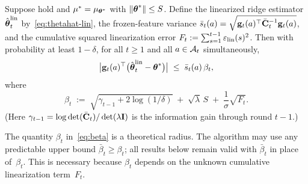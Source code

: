 \begin{lemma}%
\label{lem:confidence}
Suppose  hold and
$\mu^*=\mu_{\boldsymbol{\theta}^*}$ with $\|\boldsymbol{\theta}^*\|\le S$.
Define the linearized ridge estimator~$\hat{\boldsymbol{\theta}}_t^{\mathrm{lin}}$
by~\eqref{eq:thetahat-lin}, the frozen-feature variance
$\bar s_t(a)=\sqrt{\mathbf{g}_t(a)^\top\bar{\mathbf{C}}_t^{-1}\mathbf{g}_t(a)}$, and
the cumulative squared linearization error
$F_t := \sum_{s=1}^{t-1}\varepsilon_{\mathrm{lin}}(s)^2$.
Then with probability at least $1-\delta$, for all $t\ge 1$ and all
$a\in\mathcal{A}_t$ simultaneously,
\begin{equation}\label{eq:conf-lin}
  \bigl|\mathbf{g}_t(a)^\top
    \bigl(\hat{\boldsymbol{\theta}}_t^{\mathrm{lin}}-\boldsymbol{\theta}^*\bigr)\bigr|
  \;\le\;
  \bar s_t(a)\,\beta_t,
\end{equation}
where
\begin{equation}\label{eq:beta}
  \beta_t
  \;:=\;
  \sqrt{\gamma_{t-1} + 2\log(1/\delta)}
  \;+\; \sqrt{\lambda}\,S
  \;+\; \frac{1}{\sigma}\sqrt{F_t}.
\end{equation}
(Here $\gamma_{t-1}=\log\det(\bar{\mathbf{C}}_t)/\det(\lambda\mathbf{I})$ is the
information gain through round $t{-}1$.)

The quantity $\beta_t$ in~\eqref{eq:beta} is a theoretical radius.
The algorithm may use any predictable upper bound
$\bar\beta_t \ge \beta_t$; all results below remain valid with
$\bar\beta_t$ in place of~$\beta_t$.
This is necessary because $\beta_t$ depends on the unknown cumulative
linearization term~$F_t$.
\end{lemma}
